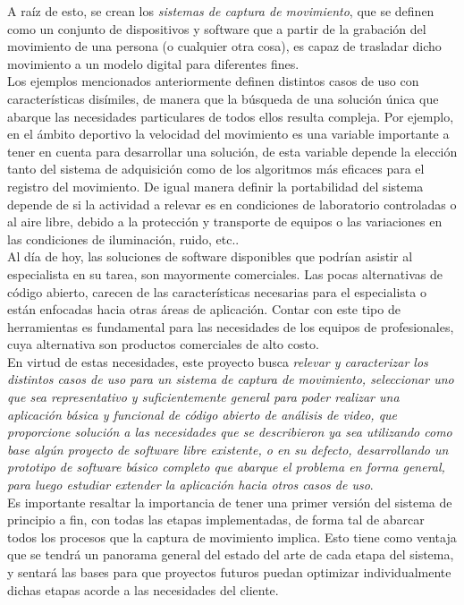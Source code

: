 A raíz de esto, se crean los \emph{sistemas de captura de movimiento}, que se definen como un conjunto de dispositivos y software que a partir de la grabación del movimiento de una persona (o cualquier otra cosa), es capaz de trasladar dicho movimiento a un modelo digital para diferentes fines.
\\ 

Los ejemplos mencionados anteriormente definen distintos casos de uso con características disímiles, de manera que la búsqueda de una solución única que abarque las necesidades particulares de todos ellos resulta compleja. Por ejemplo, en el ámbito deportivo la velocidad del movimiento es una variable importante a tener en cuenta para desarrollar una solución, de esta variable depende la elección tanto del sistema de adquisición como de los algoritmos más eficaces para el registro del movimiento.  De igual manera definir la portabilidad del sistema depende de si la actividad a relevar es en condiciones de laboratorio controladas o al aire libre, debido a la protección y transporte de equipos o las variaciones en las condiciones de iluminación, ruido, etc..
\\ 

Al  día  de  hoy, las  soluciones  de  software  disponibles que  podrían  asistir al especialista en su tarea, son mayormente comerciales. Las pocas alternativas de código abierto, carecen de las características necesarias para el especialista o están enfocadas hacia otras áreas de aplicación. Contar con este tipo de herramientas es fundamental para las necesidades de los equipos de profesionales, cuya alternativa son productos comerciales de alto costo.
\\ 

En virtud de estas necesidades, este proyecto busca \emph{relevar y caracterizar los distintos casos de uso para un sistema de captura de movimiento, seleccionar uno que sea representativo y suficientemente general para poder realizar una aplicación básica y funcional de código abierto de análisis de video, que proporcione solución a las necesidades que se describieron ya sea utilizando como base algún  proyecto  de  software  libre  existente, o en su defecto, desarrollando un prototipo de software básico completo que abarque el problema en forma general, para luego estudiar extender la aplicación hacia otros casos de uso}.
\\ 

Es importante resaltar la importancia de tener una primer versión del sistema de principio a fin, con todas las etapas implementadas, de forma tal de abarcar todos los procesos que la captura de movimiento implica.  Esto tiene como ventaja que se tendrá un panorama general del estado del arte de cada etapa del sistema, y 
sentará las bases para que proyectos futuros puedan optimizar individualmente dichas etapas acorde a las necesidades del cliente.
\\ 

